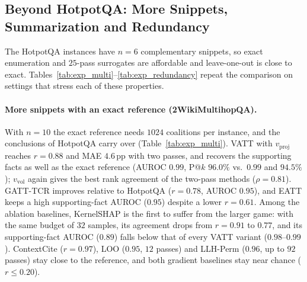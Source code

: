 \subsection{Beyond HotpotQA: More Snippets, Summarization and Redundancy}
\label{subsec:exp_multi}

The HotpotQA instances have $n = 6$ complementary snippets, so exact enumeration and $25$-pass surrogates are affordable and leave-one-out is close to exact. Tables~\ref{tab:exp_multi}--\ref{tab:exp_redundancy} repeat the comparison on settings that stress each of these properties.

\paragraph{More snippets with an exact reference (2WikiMultihopQA).}
With $n = 10$ the exact reference needs $1024$ coalitions per instance, and the conclusions of HotpotQA carry over (Table~\ref{tab:exp_multi}). VATT with $v_{\text{proj}}$ reaches $r = 0.88$ and MAE $4.6$\,pp with two passes, and recovers the supporting facts as well as the exact reference (AUROC $0.99$, P@$k$ $96.0\%$ vs.\ $0.99$ and $94.5\%$); $v_{\text{vol}}$ again gives the best rank agreement of the two-pass methods ($\rho = 0.81$). GATT-TCR improves relative to HotpotQA ($r = 0.78$, AUROC $0.95$), and EATT keeps a high supporting-fact AUROC ($0.95$) despite a lower $r = 0.61$. Among the ablation baselines, KernelSHAP is the first to suffer from the larger game: with the same budget of $32$ samples, its agreement drops from $r = 0.91$ to $0.77$, and its supporting-fact AUROC ($0.89$) falls below that of every VATT variant ($0.98$--$0.99$). ContextCite ($r = 0.97$), LOO ($0.95$, $12$ passes) and LLH-Perm ($0.96$, up to $92$ passes) stay close to the reference, and both gradient baselines stay near chance ($r \le 0.20$).

